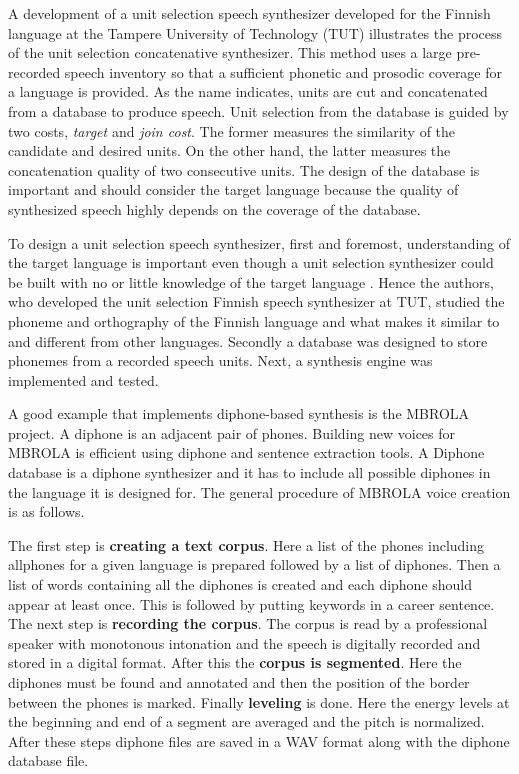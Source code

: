 \documentclass[11pt,a4paper,oneside,article]{memoir}
\begin{document}
A development of a unit selection speech synthesizer developed for the Finnish language at the Tampere University of Technology (TUT) illustrates the process of the unit selection concatenative synthesizer. This method uses a large pre-recorded speech inventory so that a sufficient phonetic and prosodic coverage for a language is provided. As the name indicates, units are cut and concatenated from a database to produce speech. Unit selection from the database is guided by two costs, \emph{target} and \emph{join cost}.  The former measures the similarity of the candidate and desired units. On the other hand, the latter measures the concatenation quality of two consecutive units. The design of the database is important and should consider the target language because the quality of synthesized speech highly depends on the coverage of the database. \cite{silen}

To design a unit selection speech synthesizer, first and foremost, understanding of the target language is important even though a unit selection synthesizer could be built with no or little knowledge of the target language \cite{silen}. Hence the authors, who developed the unit selection Finnish speech synthesizer at TUT, studied the phoneme and orthography of the Finnish language and what makes it similar to and different from other languages. Secondly a database was designed to store phonemes from a recorded speech units. Next, a synthesis engine was implemented and tested. \cite{silen}

A good example that implements diphone-based synthesis is the MBROLA project. A diphone is an adjacent pair of phones. Building new voices for MBROLA is efficient using diphone and sentence extraction tools. A Diphone database is a diphone synthesizer and it has to include all possible diphones in the language it is designed for. The general procedure of MBROLA voice creation is as follows. \cite{jolanta}

The first step is \textbf{creating a text corpus}. Here a list of the phones including allphones for a given language is prepared followed by a list of diphones. Then
a list of words containing all the diphones is created and each diphone should appear at least once. This is followed by putting keywords in a career sentence. The next step is \textbf{recording the corpus}. The corpus is read by a professional speaker with monotonous intonation and  the speech is digitally recorded and stored in a digital format. After this the \textbf{corpus is segmented}. Here the diphones must be found and annotated and then the position of the border between the phones is marked. Finally \textbf{leveling} is done. Here the energy levels at the beginning and end of a segment are averaged and the pitch is normalized. After these steps diphone files are saved in a WAV format along with the diphone database file. \cite{jolanta}
\end{document}
